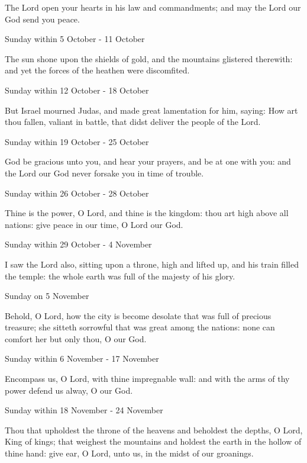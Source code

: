 \begin{multicols}{2}
The Lord open your hearts {\dag} in his law and commandments; and may the Lord our God send you peace.
\begin{inhead}
Sunday within 5 October - 11 October
\end{inhead}\par\noindent
The sun shone {\dag} upon the shields of gold, and the mountains glistered therewith: and yet the forces of the heathen were discomfited.
\begin{inhead}
Sunday within 12 October - 18 October
\end{inhead}\par\noindent
But Israel mourned Judas, {\dag} and made great lamentation for him, saying: How art thou fallen, valiant in battle, that didst deliver the people of the Lord.
\begin{inhead}
Sunday within 19 October - 25 October
\end{inhead}\par\noindent
God be gracious unto you, {\dag} and hear your prayers, and be at one with you: and the Lord our God never forsake you in time of trouble.
\begin{inhead}
Sunday within 26 October - 28 October
\end{inhead}\par\noindent
Thine is the power, O Lord, {\dag} and thine is the kingdom: thou art high above all nations: give peace in our time, O Lord our God.
\begin{inhead}
Sunday within 29 October - 4 November
\end{inhead}\par\noindent
I saw the Lord also, {\dag} sitting upon a throne, high and lifted up, and his train filled the temple: the whole earth was full of the majesty of his glory.
\columnbreak
\begin{inhead}
Sunday on 5 November
\end{inhead}\par\noindent
Behold, O Lord, {\dag} how the city is become desolate that was full of precious treasure; she sitteth sorrowful that was great among the nations: none can comfort her but only thou, O our God.
\begin{inhead}
Sunday within 6 November - 17 November
\end{inhead}\par\noindent
Encompass us, {\dag} O Lord, with thine impregnable wall: and with the arms of thy power defend us alway, O our God.
\begin{inhead}
Sunday within 18 November - 24 November
\end{inhead}\par\noindent
Thou that upholdest {\dag} the throne of the heavens and beholdest the depths, O Lord, King of kings; that weighest the mountains and holdest the earth in the hollow of thine hand: give ear, O Lord, unto us, in the midst of our groanings.


\end{multicols}
